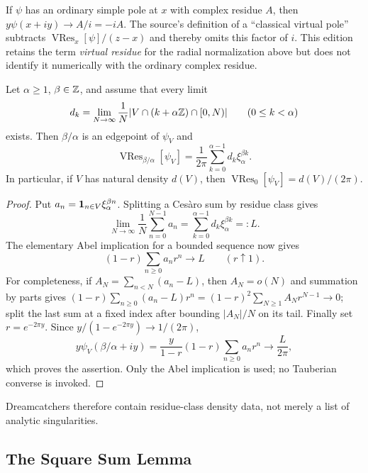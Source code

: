 \begin{sourceissue}
If $\psi$ has an ordinary simple pole at $x$ with complex residue $A$, then
$y\psi(x+iy)\to A/i=-iA$.  The source's definition of a ``classical virtual
pole'' subtracts $\operatorname{VRes}_x[\psi]/(z-x)$ and thereby omits this
factor of $i$.  This edition retains the term \emph{virtual residue} for the
radial normalization above but does not identify it numerically with the
ordinary complex residue.
\end{sourceissue}

\begin{proposition}
\label{prop:cross-section-vres}
Let $\alpha\geq1$, $\beta\in\mathbb Z$, and assume that every limit
\[
 d_k=\lim_{N\to\infty}\frac1N
 |V\cap(k+\alpha\mathbb Z)\cap[0,N)|
 \qquad(0\leq k<\alpha)
\]
exists.  Then $\beta/\alpha$ is an edgepoint of $\psi_V$ and
\begin{equation}
\label{eq:VRes-cross-section-density}
 \operatorname{VRes}_{\beta/\alpha}[\psi_V]
 =\frac1{2\pi}\sum_{k=0}^{\alpha-1}
 d_k\xi_\alpha^{\beta k}.
\end{equation}
In particular, if $V$ has natural density $d(V)$, then
$\operatorname{VRes}_0[\psi_V]=d(V)/(2\pi)$.
\end{proposition}

\begin{proof}
Put $a_n=\mathbf 1_{n\in V}\xi_\alpha^{\beta n}$.  Splitting a Ces\`aro sum by
residue class gives
\[
 \lim_{N\to\infty}\frac1N\sum_{n=0}^{N-1}a_n
 =\sum_{k=0}^{\alpha-1}d_k\xi_\alpha^{\beta k}=:L.
\]
The elementary Abel implication for a bounded sequence now gives
\[
 (1-r)\sum_{n\geq0}a_nr^n\longrightarrow L
 \qquad(r\uparrow1).
\]
For completeness, if $A_N=\sum_{n<N}(a_n-L)$, then $A_N=o(N)$ and summation
by parts gives
$(1-r)\sum_{n\geq0}(a_n-L)r^n=(1-r)^2\sum_{N\geq1}A_Nr^{N-1}\to0$;
split the last sum at a fixed index after bounding $|A_N|/N$ on its tail.
Finally set $r=e^{-2\pi y}$.  Since
$y/(1-e^{-2\pi y})\to1/(2\pi)$,
\[
 y\psi_V(\beta/\alpha+iy)
 =\frac{y}{1-r}(1-r)\sum_{n\geq0}a_nr^n
 \longrightarrow\frac{L}{2\pi},
\]
which proves the assertion.  Only the Abel implication is used; no Tauberian
converse is invoked.
\end{proof}

Dreamcatchers therefore contain residue-class density data, not merely a
list of analytic singularities.

\subsection{The Square Sum Lemma}

